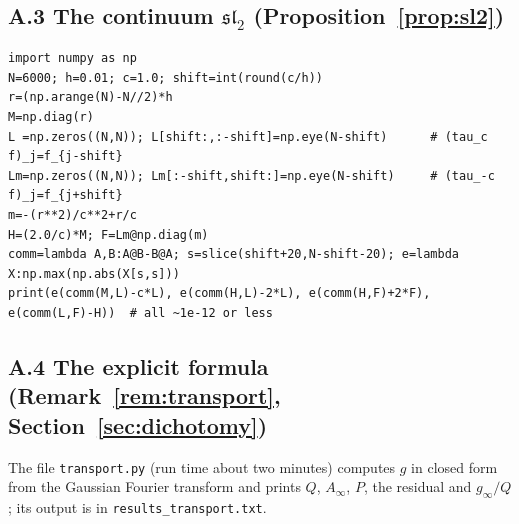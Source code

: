 \documentclass[11pt]{amsart}
\theoremstyle{definition}
\theoremstyle{remark}
\newcommand{\Ainf}{A_\infty}
\begin{document}
\subsection*{\texorpdfstring{A.3 The continuum $\mathfrak{sl}_2$ (Proposition~\ref{prop:sl2})}{A.3 The continuum sl2}}
\begin{lstlisting}
import numpy as np
N=6000; h=0.01; c=1.0; shift=int(round(c/h))
r=(np.arange(N)-N//2)*h
M=np.diag(r)
L =np.zeros((N,N)); L[shift:,:-shift]=np.eye(N-shift)      # (tau_c f)_j=f_{j-shift}
Lm=np.zeros((N,N)); Lm[:-shift,shift:]=np.eye(N-shift)     # (tau_-c f)_j=f_{j+shift}
m=-(r**2)/c**2+r/c
H=(2.0/c)*M; F=Lm@np.diag(m)
comm=lambda A,B:A@B-B@A; s=slice(shift+20,N-shift-20); e=lambda X:np.max(np.abs(X[s,s]))
print(e(comm(M,L)-c*L), e(comm(H,L)-2*L), e(comm(H,F)+2*F), e(comm(L,F)-H))  # all ~1e-12 or less
\end{lstlisting}

\subsection*{A.4 The explicit formula (Remark~\ref{rem:transport}, Section~\ref{sec:dichotomy})}
The file \texttt{transport.py} (run time about two minutes) computes $g$ in
closed form from the Gaussian Fourier transform and prints
$Q$, $\Ainf$, $P$, the residual and $g_\infty/Q$; its output is in
\texttt{results\_transport.txt}.

\end{document}
